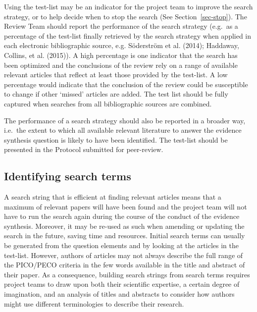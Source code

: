 \documentclass[
  letterpaper,
  DIV=11,
  numbers=noendperiod]{scrreprt}
\begin{document}
Using the test-list may be an indicator for the project team to improve
the search strategy, or to help decide when to stop the search (See
Section~\ref{sec-stop}). The Review Team should report the performance
of the search strategy (e.g.~as a percentage of the test-list finally
retrieved by the search strategy when applied in each electronic
bibliographic source, e.g. Söderström et al. (2014); Haddaway, Collins,
et al. (2015)). A high percentage is one indicator that the search has
been optimized and the conclusions of the review rely on a range of
available relevant articles that reflect at least those provided by the
test-list. A low percentage would indicate that the conclusion of the
review could be susceptible to change if other `missed' articles are
added. The test list should be fully captured when searches from all
bibliographic sources are combined.

The performance of a search strategy should also be reported in a
broader way, i.e.~the extent to which all available relevant literature
to answer the evidence synthesis question is likely to have been
identified. The test-list should be presented in the Protocol submitted
for peer-review.

\subsection{Identifying search terms}\label{identifying-search-terms}

A search string that is efficient at finding relevant articles means
that a maximum of relevant papers will have been found and the project
team will not have to run the search again during the course of the
conduct of the evidence synthesis. Moreover, it may be re-used as such
when amending or updating the search in the future, saving time and
resources. Initial search terms can usually be generated from the
question elements and by looking at the articles in the test-list.
However, authors of articles may not always describe the full range of
the PICO/PECO criteria in the few words available in the title and
abstract of their paper. As a consequence, building search strings from
search terms requires project teams to draw upon both their scientific
expertise, a certain degree of imagination, and an analysis of titles
and abstracts to consider how authors might use different terminologies
to describe their research.
\end{document}
